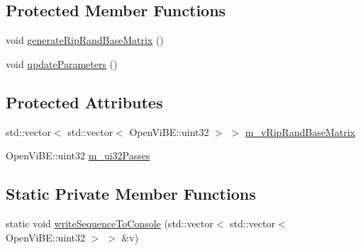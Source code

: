 \subsection*{Protected Member Functions}
\begin{DoxyCompactItemize}
\item 
void \hyperlink{classOpenViBEApplications_1_1P300RipRandSequenceGenerator_a8cef7e5c709d0a82ec06bc5f7d4590a1}{generateRipRandBaseMatrix} ()
\item 
void \hyperlink{classOpenViBEApplications_1_1P300RipRandSequenceGenerator_abf8dc29b3de5ffa47383ef0005dc77c8}{updateParameters} ()
\end{DoxyCompactItemize}
\subsection*{Protected Attributes}
\begin{DoxyCompactItemize}
\item 
std::vector$<$ std::vector$<$ OpenViBE::uint32 $>$ $>$ \hyperlink{classOpenViBEApplications_1_1P300RipRandSequenceGenerator_a1fd9f9c27224a28f11cff0d8d391e07c}{m\_\-vRipRandBaseMatrix}
\item 
OpenViBE::uint32 \hyperlink{classOpenViBEApplications_1_1P300RipRandSequenceGenerator_a07051ef0560fc28e1defbf93841e9a1b}{m\_\-ui32Passes}
\end{DoxyCompactItemize}
\subsection*{Static Private Member Functions}
\begin{DoxyCompactItemize}
\item 
static void \hyperlink{classOpenViBEApplications_1_1P300RipRandSequenceGenerator_abaa65cca1fabd5d84d62451c679e1bc9}{writeSequenceToConsole} (std::vector$<$ std::vector$<$ OpenViBE::uint32 $>$ $>$ \&v)
\end{DoxyCompactItemize}


